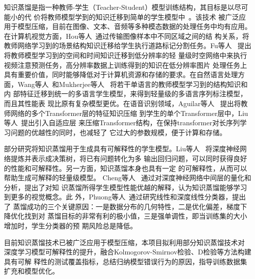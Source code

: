 知识蒸馏是指一种教师-学生（Teacher-Student）模型训练结构，其目标是以尽可能小的代
价将教师模型学到的知识迁移到简单的学生模型中~。该技术
被广泛应用于模型压缩，目前在图像、文本、音频等多种模态数据的处理任务中均有应用。
在计算机视觉方面，Hou等人~通过传输图像样本中不同区域之间的结
构关系，将教师网络学习到的场景结构知识迁移给学生执行道路标记分割任务。Fu等人
~提出将教师模型学习到的空间和时间知识迁移到低分辨率的轻
量级时空网络中来执行视频注意预测任务，高分辨率数据上训练得到的知识在低分辨率图片
处理任务上具有重要价值，同时能够降低对于计算机资源和存储的要求。在自然语言处理方
面，Wang等人~和Mukherjee等人
~将若干单语言的教师模型学习到的结构知识和内
部特征迁移到统一的多语言学生模型，来得到轻量级的多语言序列标注模型，而且其性能表
现比原有复杂模型更优。在语音识别领域，Aguilar等人
~提出将教师网络的多个Transformer层的特征知识压缩
到学生的单个Transformer层中，Liu等人~提出引入自适应层
来压缩Transformer结构，在保持transformer对长序列学习问题的优越性的同时，也减轻了
它过大的参数规模，便于计算和存储。

部分研究将知识蒸馏用于生成具有可解释性的学生模型。Liu等人
~将深度神经网络提炼并表示成决策树，将已有问题转化为多
输出回归问题，可以同时获得良好的性能和可解释性。另一方面，知识蒸馏本身也具有一定
的可解释性，从而可以帮助生成可解释的轻量级模型。 Cheng等人
~通过对深度神经网络中间层的量化和分析，提出了对知
识蒸馏所得学生模型性能优越的解释，认为知识蒸馏能够学习到更多的视觉概念。此
外，Phuong等人~通过研究线性和深度线性分类器，提出了
蒸馏成功的三个关键原因：一是数据分布的几何特性，二是优化偏差，梯度下降优化找到对
蒸馏目标的非常有利的极小值，三是强单调性，即当训练集的大小增加时，学生分类器的预
期风险总是降低。


{\kaishu 目前知识蒸馏技术已被广泛应用于模型压缩，本项目拟利用部分知识蒸馏技术对
深度学习模型可解释性的提升，融合Kolmogorov-Smirnov检验、D检验等方法构建具有可解
释性的测试覆盖指标，总结归纳模型错误行为的原因，指导训练数据集扩充和模型优化。}








\begin{spacing}{1.3} %
	 \songti
	
	
	\vspace{11bp}
\end{spacing}
